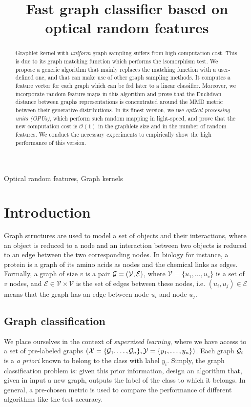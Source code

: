 \documentclass{article}
\title{Fast graph classifier based on optical random features}
\begin{document}
%
\newtheorem{theorem}{Theorem} 
\maketitle
%
\begin{abstract}
Graphlet kernel with \emph{uniform} graph sampling suffers from high computation cost. This is due to its graph matching function which performs the isomorphism test. We propose a generic algorithm that mainly replaces the matching function with a user-defined one, and that can make use of other graph sampling methods. It computes a feature vector for each graph which can be fed later to a linear classifier.  Moreover, we incorporate random feature maps in this algorithm and prove that the  Euclidean distance between graphs representations is concentrated around the MMD metric between their generative distributions. In its finest version, we use \emph{optical processing units (OPUs)}, which perform such random mapping in light-speed, and prove that the new computation cost is $\mathcal{O}(1)$ in the graphlets size and in the number of random features. We conduct the necessary experiments to empirically show the high performance of this version.

\end{abstract}
%
\begin{keywords}
Optical random features, Graph kernels
\end{keywords}
%
\section{Introduction}
\label{sec:intro}
Graph structures are used to model a set of objects and their interactions, where an object is reduced to a node and an interaction between two objects is reduced to an edge between the two corresponding nodes. In biology for instance, a protein is a graph of its amino acids as nodes and the chemical links as edges.  
Formally, a graph of size $v$ is a pair $\mathcal{G}=(\mathcal{V},\mathcal{E})$, where $\mathcal{V}=\{u_1,...,u_v\}$ is a set of $v$ nodes, and $\mathcal{E}\in \mathcal{V}\times \mathcal{V}$ is the set of edges between these nodes, i.e. $(u_i, u_j)\in \mathcal{E}$ means that the graph has an edge between node $u_i$ and node $u_j$.
\subsection{Graph classification}\label{sec:graph_classification}
We place ourselves in the context of \emph{supervised learning}, where we have access to a set of pre-labeled graphs $(\mathcal{X}=\{\mathcal{G}_1,\ldots,\mathcal{G}_n\}, \mathcal{Y}=\{y_1,\ldots,y_n\})$. Each graph $\mathcal{G}_i$ is a \emph{a priori} known to belong to the class with label $y_i$. Simply, the graph classification problem is: given this prior information, design an algorithm that, given in input a new graph, outputs the label of the class to which it belongs. In general, a pre-chosen metric is used to compare the performance of different algorithms like the test accuracy. 
\end{document}
